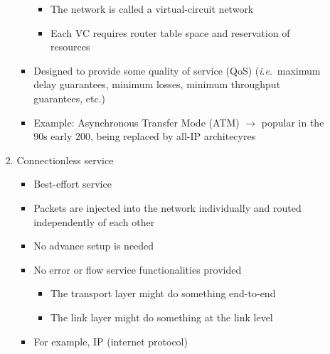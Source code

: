 \begin{itemize}
\begin{itemize}
\begin{enumerate}
\begin{itemize}
\begin{itemize}
                  \item The network is called a virtual-circuit network

                  \item Each VC requires router table space and reservation of resources

                \end{itemize}

              \item Designed to provide some quality of service (QoS) (\textit{i}.\textit{e}.\ maximum delay guarantees, minimum losses, minimum throughput guarantees, etc.)

              \item Example: Asynchronous Transfer Mode (ATM) $\to$ popular in the 90s early 200, being replaced by all-IP architecyres

            \end{itemize}

          \item Connectionless service

            \begin{itemize}

              \item Best-effort service

              \item Packets are injected into the network individually and routed independently of each other

              \item No advance setup is needed

              \item No error or flow service functionalities provided

                \begin{itemize}

                  \item The transport layer might do something end-to-end

                  \item The link layer might do something at the link level

                \end{itemize}

              \item For example, IP (internet protocol)

            \end{itemize}


\end{enumerate}
\end{itemize}
\end{itemize}
